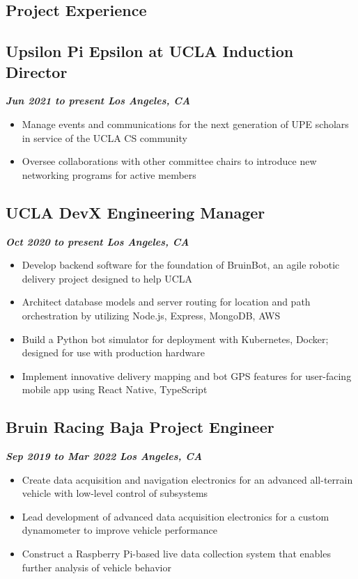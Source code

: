 \documentclass[10pt]{article}
\begin{document}
\begin{raggedright}
    \section*{Project Experience}

        \subsection*{\textbf{\large{Upsilon Pi Epsilon at UCLA \textendash{} Induction Director}}} \hfill \textbf{\textit{Jun 2021 to present \textendash{} Los Angeles, CA}}
        \begin{itemize}
            \item Manage events and communications for the next generation of UPE scholars in service of the UCLA CS community
            \item Oversee collaborations with other committee chairs to introduce new networking programs for active members
        \end{itemize}

        \subsection*{\textbf{\large{UCLA DevX \textendash{} Engineering Manager}}} \hfill \textbf{\textit{Oct 2020 to present \textendash{} Los Angeles, CA}}
        \begin{itemize}
            \item Develop backend software for the foundation of BruinBot, an agile robotic delivery project designed to help UCLA
            \item Architect database models and server routing for location and path orchestration by utilizing Node.js, Express, MongoDB, AWS
            \item Build a Python bot simulator for deployment with Kubernetes, Docker; designed for use with production hardware
            \item Implement innovative delivery mapping and bot GPS features for user-facing mobile app using React Native, TypeScript
        \end{itemize}

        \subsection*{\textbf{\large{Bruin Racing Baja \textendash{} Project Engineer}}} \hfill \textbf{\textit{Sep 2019 to Mar 2022 \textendash{} Los Angeles, CA}}
        \begin{itemize}
            \item Create data acquisition and navigation electronics for an advanced all-terrain vehicle with low-level control of subsystems
            \item Lead development of advanced data acquisition electronics for a custom dynamometer to improve vehicle performance
            \item Construct a Raspberry Pi-based live data collection system that enables further analysis of vehicle behavior
        \end{itemize}
        

\end{raggedright}
\end{document}
